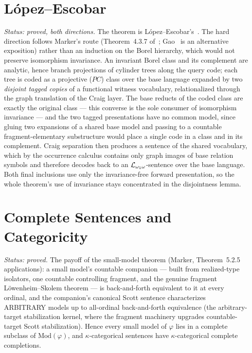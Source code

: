 
\section{L\'opez--Escobar}

\emph{Status: proved, both directions.}  The theorem is
L\'opez--Escobar's~\cite{lopezescobar1965}.  The hard direction follows Marker's
route (Theorem~4.3.7 of~\cite{marker2016}; Gao~\cite[Theorem~11.3.6]{gao2009} is an
alternative exposition) rather than an induction on the Borel
hierarchy, which would not preserve isomorphism invariance.  An invariant Borel
class and its complement are analytic, hence branch projections of cylinder
trees along the query code; each tree is coded as a projective ($PC$) class over
the base language expanded by two \emph{disjoint tagged copies} of a functional
witness vocabulary, relationalized through the graph translation of the Craig
layer.  The base reducts of the coded class are exactly the original class ---
this converse is the sole consumer of isomorphism invariance --- and the two
tagged presentations have no common model, since gluing two expansions of a
shared base model and passing to a countable fragment-elementary substructure
would place a single code in a class and in its complement.  Craig separation
then produces a sentence of the shared vocabulary, which by the occurrence
calculus contains only graph images of base relation symbols and therefore
decodes back to an $\mathcal{L}_{\omega_1\omega}$-sentence over the base language.  Both final
inclusions use only the invariance-free forward presentation, so the whole
theorem's use of invariance stays concentrated in the disjointness lemma.




\section{Complete Sentences and Categoricity}

\emph{Status: proved.}  The payoff of the small-model theorem (Marker, Theorem~5.2.5
applications): a small model's countable companion — built from realized-type isolators, one
countable controlling fragment, and the genuine fragment L\"owenheim--Skolem theorem — is
back-and-forth equivalent to it at every ordinal, and the companion's canonical Scott sentence
characterizes ARBITRARY models up to all-ordinal back-and-forth equivalence (the
arbitrary-target stabilization kernel, where the fragment machinery upgrades countable-target
Scott stabilization).  Hence every small model of $\varphi$ lies in a complete subclass of
$\mathrm{Mod}(\varphi)$, and $\kappa$-categorical sentences have $\kappa$-categorical
complete completions.

